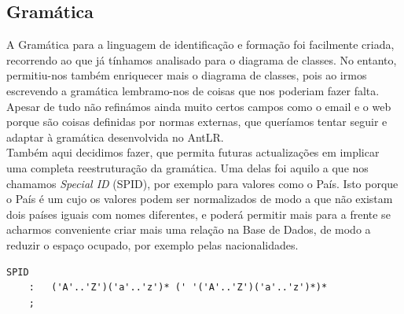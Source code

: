 \documentclass[a4paper,11pt,openright,openbib]{article}
\begin{document}
\subsection{Gramática}
A Gramática para a linguagem de identificação e formação foi facilmente criada, recorrendo ao que já tínhamos analisado para o diagrama de classes. No entanto, permitiu-nos também enriquecer mais o diagrama de classes, pois ao irmos escrevendo a gramática lembramo-nos de coisas que nos poderiam fazer falta.\\
Apesar de tudo não refinámos ainda muito certos campos como o email e o web porque são coisas definidas por normas externas, que queríamos tentar seguir e adaptar à gramática desenvolvida no AntLR.\\
Também aqui decidimos fazer, que permita futuras actualizações em implicar uma completa reestruturação da gramática. Uma delas foi aquilo a que nos chamamos \emph{Special ID} (SPID), por exemplo para valores como o País. Isto porque o País é um cujo os valores podem ser normalizados de modo a que não existam dois países iguais com nomes diferentes, e poderá permitir mais para a frente se acharmos conveniente criar mais uma relação na Base de Dados, de modo a reduzir o espaço ocupado, por exemplo pelas nacionalidades.
\begin{verbatim}
SPID
	:	('A'..'Z')('a'..'z')* (' '('A'..'Z')('a'..'z')*)*
	;
\end{verbatim}
\end{document}
